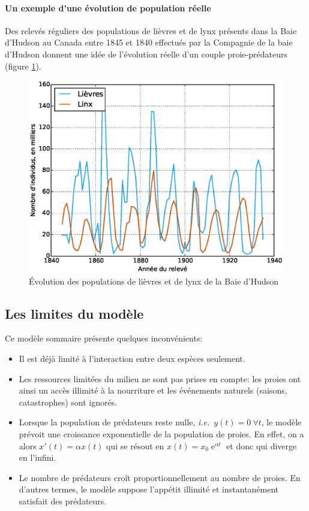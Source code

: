 \documentclass[11pt]{article}
\DeclareMathOperator{\e}{e}
\newcommand{\ie}{\textsl{i.e.}\ }
\begin{document}
\paragraph{Un exemple d'une évolution de population réelle}
Des relevés réguliers des populations de lièvres et de lynx présents dans la Baie d'Hudson au Canada entre 1845 et 1840 effectués par la Compagnie de la baie d'Hudson donnent une idée de l'évolution réelle d'un couple proie-prédateurs (figure \ref{fig:baie_hudson}).
\begin{figure}[!ht]
    \centering
    \includegraphics[width=15cm]{evolution.eps}
    \caption{Évolution des populations de lièvres et de lynx de la Baie d'Hudson}
    \label{fig:baie_hudson}
\end{figure}

\subsection{Les limites du modèle}\label{limites}
Ce modèle sommaire présente quelques inconvénients:
\begin{itemize}[label=\textendash]
    \item Il est déjà limité à l'interaction entre deux espèces seulement.
    \item Les ressources limitées du milieu ne sont pas prises en compte: les proies ont ainsi un accès illimité à la nourriture et les événements naturels (saisons, catastrophes) sont ignorés.
    \item Lorsque la population de prédateurs reste nulle, \ie $y(t) = 0\ \forall t$, le modèle prévoit une croissance exponentielle de la population de proies. En effet, on a alors $x'(t) = \alpha x(t)$ qui se résout en $x(t) = x_0\e^{\alpha t}$ et donc qui diverge en l'infini.
    \item Le nombre de prédateurs croît proportionnellement au nombre de proies. En d'autres termes, le modèle suppose l'appétit illimité et instantanément satisfait des prédateurs.  
\end{itemize}
\end{document}
